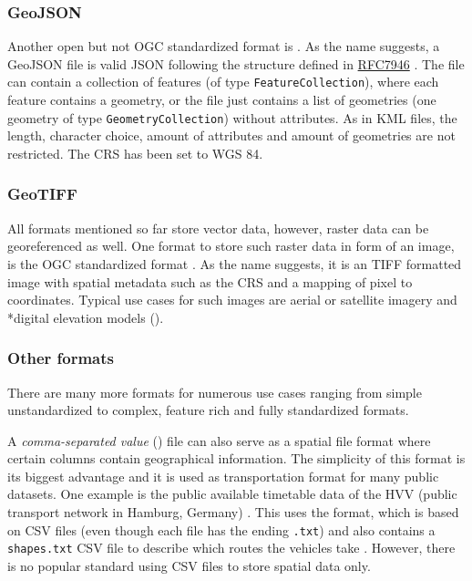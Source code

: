 		\subsubsection{GeoJSON}
		\label{subsubsec:geojson}
		
			Another open but not OGC standardized format is .
			As the name suggests, a GeoJSON file is valid JSON following the structure defined in \href{https://datatracker.ietf.org/doc/html/rfc7946}{RFC7946} \cite{ietf-geojson}.
			The file can contain a collection of features (of type \texttt{FeatureCollection}), where each feature contains a geometry, or the file just contains a list of geometries (one geometry of type \texttt{GeometryCollection}) without attributes.
			As in KML files, the length, character choice, amount of attributes and amount of geometries are not restricted.
			The CRS has been set to WGS 84.
			
		\subsubsection{GeoTIFF}
		
			All formats mentioned so far store vector data, however, raster data can be georeferenced as well.
			One format to store such raster data in form of an image, is the OGC standardized  format \cite{ogc-geotiff}.
			As the name suggests, it is an TIFF formatted image with spatial metadata such as the CRS and a mapping of pixel to coordinates.
			Typical use cases for such images are aerial or satellite imagery and *{digital elevation models} ().
		
		\subsubsection{Other formats}
		
			There are many more formats for numerous use cases ranging from simple unstandardized to complex, feature rich and fully standardized formats.
			
			A \emph{comma-separated value} () file can also serve as a spatial file format where certain columns contain geographical information.
			The simplicity of this format is its biggest advantage and it is used as transportation format for many public datasets.
			One example is the public available timetable data of the HVV (public transport network in Hamburg, Germany) \cite{hvv-fahrplandaten}.
			This uses the  format, which is based on CSV files (even though each file has the ending \texttt{.txt}) and also contains a \texttt{shapes.txt} CSV file to describe which routes the vehicles take \cite{google-gtfs}.
			However, there is no popular standard using CSV files to store spatial data only.
			
